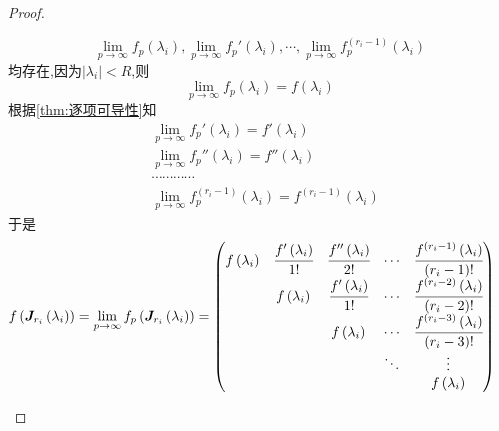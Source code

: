 {\begin{proof}
\begin{enumerate}[label=\arabic*）]
\[                      \lim_{p\to\infty}f_p\left(
                      \lambda_i
                      \right),\lim_{p\to\infty}f_p'\left(
                      \lambda_i
                      \right),\cdots,\lim_{p\to\infty}f_p^{\left(r_i-1\right)}\left(
                      \lambda_i
                      \right)
                  \]均存在,因为$\left|\lambda_i\right|<R$,则\[
                      \lim_{p\to\infty}f_p\left(\lambda_i\right)=f\left(\lambda_i\right)
                  \]根据\cref{thm:逐项可导性}知\begin{align*}
                       & \lim_{p\to\infty}f_p'\left(\lambda_i\right)=f'\left(\lambda_i\right)                                         \\
                       & \lim_{p\to\infty}f_p''\left(\lambda_i\right)=f''\left(\lambda_i\right)                                       \\
                       & \cdots\cdots\cdots\cdots                                                                                     \\
                       & \lim_{p\to\infty}f_p^{\left(r_i-1\right)}\left(\lambda_i\right)=f^{\left(r_i-1\right)}\left(\lambda_i\right)
                  \end{align*}于是\begin{align*}
                      f\left(
                      \bm{J}_{r_i}\left(\lambda_i\right)
                      \right)=\lim_{p\to\infty}f_p\left(
                      \bm{J}_{r_i}\left(\lambda_i\right)
                      \right) & =\begin{pmatrix}
                                     f\left(\lambda_i\right) & \cfrac{f'\left(\lambda_i\right)}{1!} & \cfrac{f''\left(\lambda_i\right)}{2!} & \cdots & \cfrac{f^{\left(r_i-1\right)}\left(\lambda_i\right)}{\left(r_i-1\right)!} \\
                                                             & f\left(\lambda_i\right)              & \cfrac{f'\left(\lambda_i\right)}{1!}  & \cdots & \cfrac{f^{\left(r_i-2\right)}\left(\lambda_i\right)}{\left(r_i-2\right)!} \\
                                                             &                                      & f\left(\lambda_i\right)               & \cdots & \cfrac{f^{\left(r_i-3\right)}\left(\lambda_i\right)}{\left(r_i-3\right)!} \\
                                                             &                                      &                                       & \ddots & \vdots                                                                    \\
                                                             &                                      &                                       &        & f\left(\lambda_i\right)
                                 \end{pmatrix}\qedhere
                  \end{align*}
        \end{enumerate}
    \end{proof}
}
